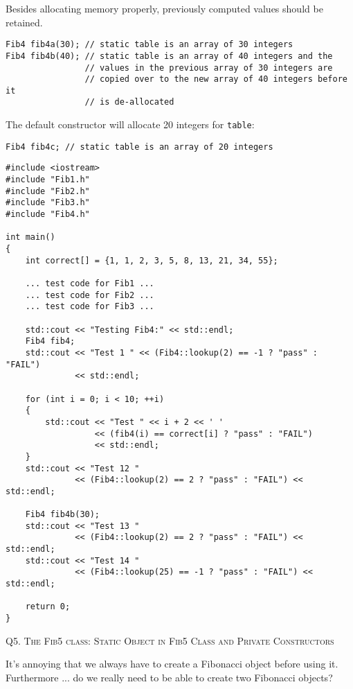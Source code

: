 Besides allocating memory properly, previously computed values should be retained.

\begin{Verbatim}[frame=single]
Fib4 fib4a(30); // static table is an array of 30 integers
Fib4 fib4b(40); // static table is an array of 40 integers and the
                // values in the previous array of 30 integers are
                // copied over to the new array of 40 integers before it
                // is de-allocated
\end{Verbatim}

The default constructor will allocate 20 integers for \verb!table!:
\begin{Verbatim}[frame=single]
Fib4 fib4c; // static table is an array of 20 integers
\end{Verbatim}




\newpage
\begin{Verbatim}[frame=single]
#include <iostream>
#include "Fib1.h"
#include "Fib2.h"
#include "Fib3.h"
#include "Fib4.h"

int main()
{
    int correct[] = {1, 1, 2, 3, 5, 8, 13, 21, 34, 55};

    ... test code for Fib1 ...
    ... test code for Fib2 ...
    ... test code for Fib3 ...

    std::cout << "Testing Fib4:" << std::endl;
    Fib4 fib4;
    std::cout << "Test 1 " << (Fib4::lookup(2) == -1 ? "pass" : "FAIL")
              << std::endl;

    for (int i = 0; i < 10; ++i)
    {
        std::cout << "Test " << i + 2 << ' '
                  << (fib4(i) == correct[i] ? "pass" : "FAIL")
                  << std::endl;
    }
    std::cout << "Test 12 "
              << (Fib4::lookup(2) == 2 ? "pass" : "FAIL") << std::endl;

    Fib4 fib4b(30);
    std::cout << "Test 13 "
              << (Fib4::lookup(2) == 2 ? "pass" : "FAIL") << std::endl;
    std::cout << "Test 14 "
              << (Fib4::lookup(25) == -1 ? "pass" : "FAIL") << std::endl;

    return 0;
}
\end{Verbatim}





\newpage
Q5.
\textsc{The Fib5 class: Static Object in Fib5 Class and Private Constructors}

It's annoying that we always have to create a Fibonacci object before using it. Furthermore ... do we
really need to be able to create two Fibonacci objects?

